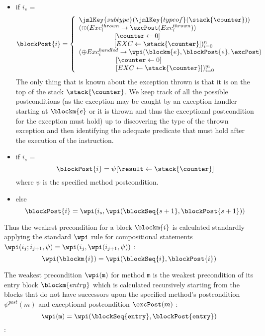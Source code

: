 \begin{defn}
\begin{itemize}
\item  if  $i_s$ =   \\ 
$$
\blockPost{i }  \\ 
 =   \left\{ \begin{array}{l} 
		\jmlKey{subtype}( \jmlKey{ typeof}(\stack{\counter} )) \\
		(\oplus (Exc_{i}^{thrown} \rightarrow \excPost(Exc_{i}^{thrown}) ) \\
		\phantom{\oplus Exc^{thrown} } [\counter \leftarrow  0] \\ 
		\phantom{ \oplus Exc^{thrown} } [EXC \leftarrow  \stack{\counter} ] )_{i=0}^{n}   \\
		(\oplus Exc_{i}^{handled} \rightarrow \wpi(\blockm{e}, \blockPost{e}, \excPost )\\
		\phantom{\oplus Exc^{handled} } [\counter \leftarrow  0] \\ 
		\phantom{ \oplus Exc^{handled}} [EXC \leftarrow  \stack{\counter} ] )_{i=0}^{m} \\
		\end{array} \right.
$$
The only thing that is known about the exception thrown is that it is 
on the top of the stack $\stack{\counter}$. We keep track of all the possible postconditions (as the exception
may be caught by an exception handler starting at $\blockm{e}$ or it is thrown and thus the exceptional postcondition for 
the exception must hold) up to
discovering the type of the thrown exception and then identifying the adequate predicate 
that must hold after the execution of the  instruction. 
\item  if  $i_s$ =  \\
$$
   \blockPost{i } = \psi[\result \leftarrow \stack{\counter} ]    
$$
where $\psi $ is the specified method postcondition.
\item  else  
 $$ \blockPost{i} =  \wpi(  i_s , \wpi( \blockSeq{s+1} ,  \blockPost{ s  +1} ) )  $$ 
 \end{itemize}
\end{defn}

Thus the weakest precondition for a block $\blockm{i}$ is calculated standardly applying the standard $\wpi$ rule for compositional statements $\wpi( i_j;i_{j+1}, \psi) =\wpi( i_j, \wpi(i_{j+1}, \psi)) $ :
 $$ \wpi(\blockm{i}) = \wpi( \blockSeq{i}, \blockPost{i} ) $$

The weakest precondition $\wpi(\tt{m})$ for method \texttt{m}  is the weakest precondition of its entry block $\blockm{entry}$ which is calculated recursively starting from the blocks that do not have successors upon the specified method's postcondition  $\psi^{post}(m)$ and exceptional postcondition $\excPost (m)$ :
 $$\wpi(\tt{m}) = \wpi(\blockSeq{entry}, \blockPost{entry}   ) $$:


